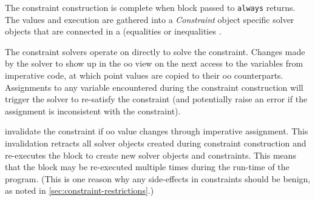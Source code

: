 The constraint construction is complete when \DIFaddbegin {}\DIFaddend block passed to
\lstinline{always} returns. The values and \DIFdelbegin {}\DIFdelend \DIFaddbegin {}\DIFaddend execution are gathered into a
\emph{Constraint} object \DIFdelbegin {}\DIFdelend \DIFaddbegin {}\DIFaddend specific solver objects \DIFaddbegin {}\DIFaddend that are
connected in a \DIFdelbegin {}\DIFdelend \DIFaddbegin {}\DIFaddend (\eg \DIFdelbegin {}\DIFdelend \DIFaddbegin {}\DIFaddend equalities or inequalities \DIFdelbegin {}\DIFdelend \DIFaddbegin {}\DIFaddend .

The constraint solvers operate on \DIFdelbegin {}\DIFdelend \DIFaddbegin {}\DIFaddend directly to
solve the constraint. Changes made by the solver to \DIFdelbegin {}\DIFdelend \DIFaddbegin {}\DIFaddend show
up in the \ac{oo} view on the next access to the variables from
imperative code, at which point \DIFdelbegin {}\DIFdelend \DIFaddbegin {}\DIFaddend values are copied to their
\ac{oo} counterparts. Assignments to any variable encountered during
the constraint construction will trigger the solver to re-satisfy the
constraint (and potentially raise an error if the assignment is
inconsistent with the constraint).

\DIFdelbegin {}\DIFdelend \DIFaddbegin {}\DIFaddend invalidate the constraint if \DIFdelbegin {}\DIFdelend \DIFaddbegin {}\DIFaddend \ac{oo}
value changes through imperative assignment. This invalidation
retracts all solver objects created during constraint construction and
re-executes the block to create new solver objects and
constraints. This means that the block may be re-executed multiple
times during the run-time of the program.  (This is one reason why any
side-effects in constraints should be benign, as noted in
{\autoref{sec:constraint-restrictions}}.)

